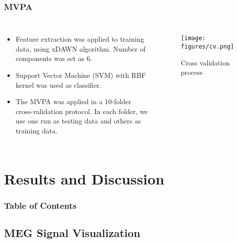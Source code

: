 \documentclass[aspectratio=169]{beamer}
\begin{document}
\begin{frame}
    \frametitle{MVPA}

    \begin{columns}

        \begin{itemize}
            \item Feature extraction was applied to training data, using xDAWN algorithm.
                  Number of components was set as $6$.
            \item Support Vector Machine (SVM) with RBF kernel was used as classifier.
            \item The MVPA was applied in a 10-folder cross-validation protocol.
                  In each folder, we use one run as testing data and others as training data.
        \end{itemize}


        \begin{figure}[h]
            \centering
            \texttt{[image: figures/cv.png]}
            \caption{Cross validation process}
        \end{figure}

    \end{columns}

\end{frame}

\section{Results and Discussion}

\begin{frame}[plain]
    \frametitle{Table of Contents}
\end{frame}

\subsection{MEG Signal Visualization}
\end{document}
